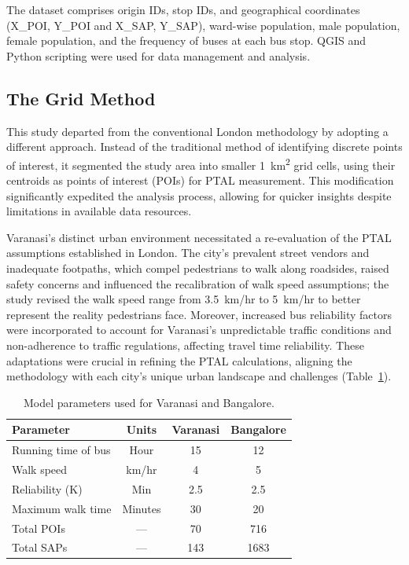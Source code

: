 \documentclass[11pt]{article}
\begin{document}
The dataset comprises origin IDs, stop IDs, and geographical coordinates (X\_POI, Y\_POI and
X\_SAP, Y\_SAP), ward-wise population, male population, female population, and the frequency of
buses at each bus stop. QGIS and Python scripting were used for data management and analysis.

\subsection{The Grid Method}

This study departed from the conventional London methodology by adopting a different approach.
Instead of the traditional method of identifying discrete points of interest, it segmented the
study area into smaller 1~km\textsuperscript{2} grid cells, using their centroids as points of
interest (POIs) for PTAL measurement. This modification significantly expedited the analysis
process, allowing for quicker insights despite limitations in available data resources.

Varanasi's distinct urban environment necessitated a re-evaluation of the PTAL assumptions
established in London. The city's prevalent street vendors and inadequate footpaths, which
compel pedestrians to walk along roadsides, raised safety concerns and influenced the
recalibration of walk speed assumptions; the study revised the walk speed range from
3.5~km/hr to 5~km/hr to better represent the reality pedestrians face. Moreover, increased bus
reliability factors were incorporated to account for Varanasi's unpredictable traffic conditions
and non-adherence to traffic regulations, affecting travel time reliability. These adaptations
were crucial in refining the PTAL calculations, aligning the methodology with each city's unique
urban landscape and challenges (Table~\ref{tab:parameters}).

\begin{table}[H]
\centering
\caption{Model parameters used for Varanasi and Bangalore.}
\label{tab:parameters}
\begin{tabular}{lccc}
\toprule
\textbf{Parameter} & \textbf{Units} & \textbf{Varanasi} & \textbf{Bangalore} \\
\midrule
Running time of bus & Hour & 15 & 12 \\
Walk speed & km/hr & 4 & 5 \\
Reliability (K) & Min & 2.5 & 2.5 \\
Maximum walk time & Minutes & 30 & 20 \\
Total POIs & --- & 70 & 716 \\
Total SAPs & --- & 143 & 1683 \\
\bottomrule
\end{tabular}
\end{table}
\end{document}
